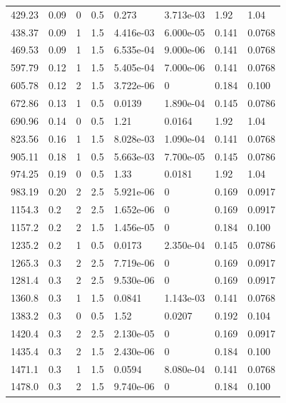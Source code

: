 \documentclass[preview]{standalone}
\begin{document}
{{\begin{tabular}{L{1.2cm}C{1.2cm} C{0.3cm}C{0.5cm} C{1.4cm}C{1.4cm} C{1.4cm}C{1.4cm}}
  429.23  &  0.09  & 0     & 0.5 &  0.273  & 3.713e-03  & 1.92 &  1.04   \\ 
  438.37  &  0.09  & 1     & 1.5 &  4.416e-03  & 6.000e-05  & 0.141 &  0.0768   \\ 
  469.53  &  0.09  & 1     & 1.5 &  6.535e-04  & 9.000e-06  & 0.141 &  0.0768   \\ 
  597.79  &  0.12  & 1     & 1.5 &  5.405e-04  & 7.000e-06  & 0.141 &  0.0768   \\ 
  605.78  &  0.12  & 2     & 1.5 &  3.722e-06  & 0  & 0.184 &  0.100   \\ 
  672.86  &  0.13  & 1     & 0.5 &  0.0139  & 1.890e-04  & 0.145 &  0.0786   \\ 
  690.96  &  0.14  & 0     & 0.5 &  1.21  & 0.0164  & 1.92 &  1.04   \\ 
  823.56  &  0.16  & 1     & 1.5 &  8.028e-03  & 1.090e-04  & 0.141 &  0.0768   \\ 
  905.11  &  0.18  & 1     & 0.5 &  5.663e-03  & 7.700e-05  & 0.145 &  0.0786   \\ 
  974.25  &  0.19  & 0     & 0.5 &  1.33  & 0.0181  & 1.92 &  1.04   \\ 
  983.19  &  0.20  & 2     & 2.5 &  5.921e-06  & 0  & 0.169 &  0.0917   \\ 
  1154.3  &   0.2  & 2     & 2.5 &  1.652e-06  & 0  & 0.169 &  0.0917   \\ 
  1157.2  &   0.2  & 2     & 1.5 &  1.456e-05  & 0  & 0.184 &  0.100   \\ 
  1235.2  &   0.2  & 1     & 0.5 &  0.0173  & 2.350e-04  & 0.145 &  0.0786   \\ 
  1265.3  &   0.3  & 2     & 2.5 &  7.719e-06  & 0  & 0.169 &  0.0917   \\ 
  1281.4  &   0.3  & 2     & 2.5 &  9.530e-06  & 0  & 0.169 &  0.0917   \\ 
  1360.8  &   0.3  & 1     & 1.5 &  0.0841  & 1.143e-03  & 0.141 &  0.0768   \\ 
  1383.2  &   0.3  & 0     & 0.5 &  1.52  & 0.0207  & 0.192 &  0.104   \\ 
  1420.4  &   0.3  & 2     & 2.5 &  2.130e-05  & 0  & 0.169 &  0.0917   \\ 
  1435.4  &   0.3  & 2     & 1.5 &  2.430e-06  & 0  & 0.184 &  0.100   \\ 
  1471.1  &   0.3  & 1     & 1.5 &  0.0594  & 8.080e-04  & 0.141 &  0.0768   \\ 
  1478.0  &   0.3  & 2     & 1.5 &  9.740e-06  & 0  & 0.184 &  0.100   \\ 

\end{tabular}}}
\end{document}
